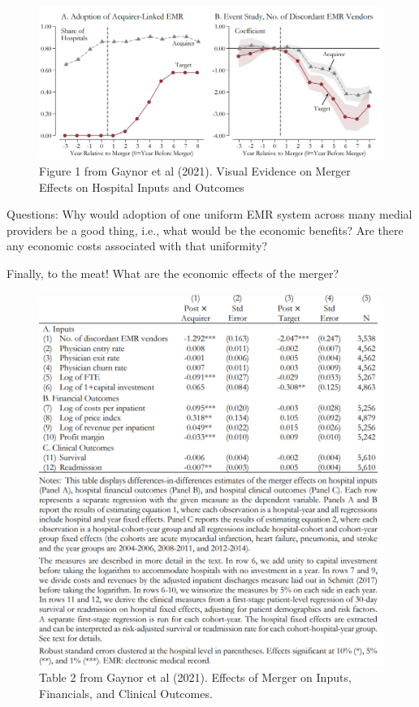 \documentclass[
]{book}
\begin{document}
\begin{figure}

{\centering \includegraphics[width=0.7\linewidth]{img/oligopoly/papertable2} 

}

\caption{Figure 1 from Gaynor et al (2021). Visual Evidence on Merger Effects on Hospital Inputs and Outcomes}\label{fig:oligopolypapertable2}
\end{figure}

Questions: Why would adoption of one uniform EMR system across many medial providers be a good thing, i.e., what would be the economic benefits? Are there any economic costs associated with that uniformity?

Finally, to the meat! What are the economic effects of the merger?

\begin{figure}

{\centering \includegraphics[width=0.7\linewidth]{img/oligopoly/papertable3} 

}

\caption{Table 2 from Gaynor et al (2021). Effects of Merger on Inputs, Financials, and Clinical Outcomes.}\label{fig:oligopolypapertable3}
\end{figure}
\end{document}
